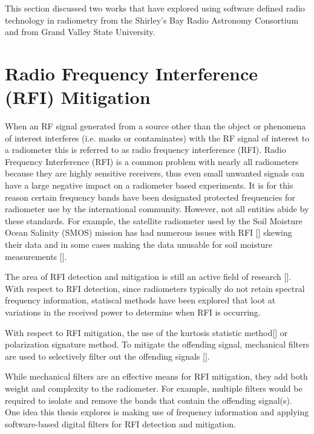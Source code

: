 This section discussed two works that have explored using software defined radio technology in radiometry from the Shirley's Bay Radio Astronomy Consortium and from Grand Valley State University.

\section{Radio Frequency Interference (RFI) Mitigation}
When an RF signal generated from a source other than the object or phenomena of interest interferes (i.e. masks or contaminates) with the RF signal of interest to a radiometer this is referred to as radio frequency interference (RFI).  Radio Frequency Interference (RFI) is a common problem with nearly all radiometers because they are highly sensitive receivers, thus even small unwanted signals can have a large negative impact on a radiometer based experiments.  It is for this reason certain frequency bands have been designated protected frequencies for radiometer use by the international community.  However, not all entities abide by these standards.  For example, the satellite radiometer used by the Soil Moisture Ocean Salinity (SMOS) mission has had numerous issues with RFI [\cite{Kerr}] skewing their data and in some cases making the data unusable for soil moisture measurements [\cite{Richaume}].  

The area of RFI detection and mitigation is still an active field of research [\cite{Forte}].  With respect to RFI detection, since radiometers typically do not retain spectral frequency information, statiscal methods have been explored that loot at variations in the received power to determine when RFI is occurring.

With respect to RFI mitigation, the use of the kurtosis statistic method[\cite{DeRoo}] or polarization signature method.  To mitigate the offending signal, mechanical filters are used to selectively filter out the offending signals [\cite{DeRooRFI}].  

While mechanical filters are an effective means for RFI mitigation, they add both weight and complexity to the radiometer.  For example, multiple filters would be required to isolate and remove the bands that contain the offending signal(s).  One idea this thesis explores is making use of frequency information and applying software-based digital filters for RFI detection and mitigation.



